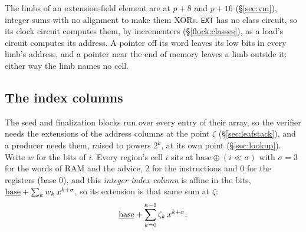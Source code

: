 The limbs of an extension-field element are at $p+8$ and $p+16$ (\S\ref{sec:vm}), integer sums with no alignment to make them XORs. \texttt{EXT} has no class circuit, so its clock circuit computes them, by incrementers (\S\ref{flock:classes}), as a load's circuit computes its address. A pointer off its word leaves its low bits in every limb's address, and a pointer near the end of memory leaves a limb outside it: either way the limb names no cell.

\subsection{The index columns}\label{sec:idxcol}

The seed and finalization blocks run over every entry of their array, so the verifier needs the extensions of the address columns at the point $\zeta$ (\S\ref{sec:leafstack}), and a producer needs them, raised to powers $2^{k}$, at its own point (\S\ref{sec:lookup}). Write $w$ for the bits of $i$. Every region's cell $i$ sits at $\mathrm{base}\oplus(i\ll\sigma)$ with $\sigma=3$ for the words of RAM and the advice, $2$ for the instructions and $0$ for the registers (base $0$), and this \emph{integer index column} is affine in the bits, $\underline{\mathrm{base}}+\sum_k w_k\,x^{k+\sigma}$, so its extension is that same sum at $\zeta$:
\[
  \underline{\mathrm{base}}+\sum_{k=0}^{\kappa-1}\zeta_k\,x^{k+\sigma}.
\]
